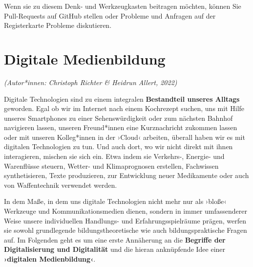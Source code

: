 \documentclass[
  a4paper,
]{book}
\begin{document}
Wenn sie zu diesem Denk- und Werkzeugkasten beitragen möchten, können Sie Pull-Requests auf GitHub stellen oder Probleme und Anfragen auf der Registerkarte Probleme diskutieren.

\chapter{Digitale Medienbildung}\label{digitale-medienbildung}

\emph{(Autor*innen: Christoph Richter \& Heidrun Allert, 2022)}

Digitale Technologien sind zu einem integralen \textbf{Bestandteil unseres Alltags} geworden. Egal ob wir im Internet nach einem Kochrezept suchen, uns mit Hilfe unseres Smartphones zu einer Sehenswürdigkeit oder zum nächsten Bahnhof navigieren lassen, unseren Freund*innen eine Kurznachricht zukommen lassen oder mit unseren Kolleg*innen in der ›Cloud‹ arbeiten, überall haben wir es mit digitalen Technologien zu tun. Und auch dort, wo wir nicht direkt mit ihnen interagieren, mischen sie sich ein. Etwa indem sie Verkehrs-, Energie- und Warenflüsse steuern, Wetter- und Klimaprognosen erstellen, Fachwissen synthetisieren, Texte produzieren, zur Entwicklung neuer Medikamente oder auch von Waffentechnik verwendet werden.

In dem Maße, in dem uns digitale Technologien nicht mehr nur als ›bloße‹ Werkzeuge und Kommunikationsmedien dienen, sondern in immer umfassenderer Weise unsere individuellen Handlungs- und Erfahrungsspielräume prägen, werfen sie sowohl grundlegende bildungstheoretische wie auch bildungspraktische Fragen auf. Im Folgenden geht es um eine erste Annäherung an die \textbf{Begriffe der Digitalisierung und Digitalität} und die hieran anknüpfende Idee einer \textbf{›digitalen Medienbildung‹}.
\end{document}
